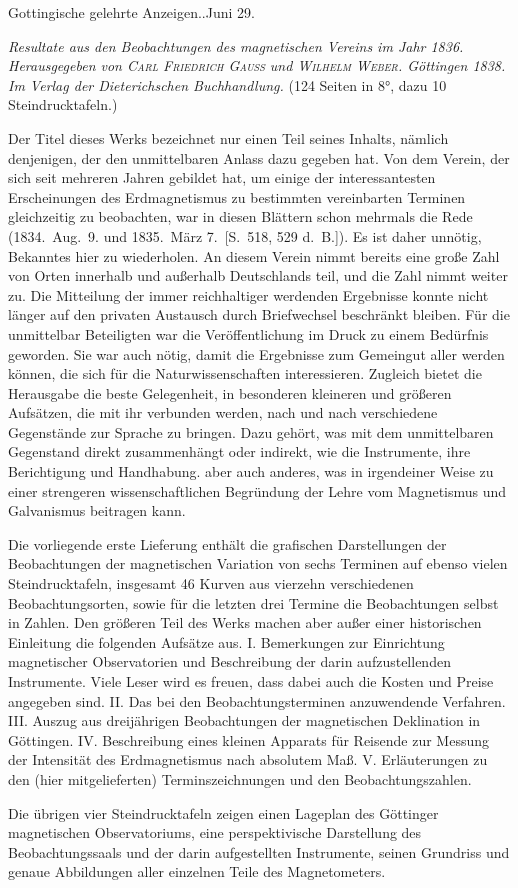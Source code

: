 \vspace{6mm}
\begin{center}\small Gottingische gelehrte Anzeigen..\quad Juni 29.\end{center}

\textit{Resultate aus den Beobachtungen des magnetischen Vereins im Jahr \textup{1836.} Herausgegeben von \textup{\textsc{Carl Friedrich Gauss}} und \textup{\textsc{Wilhelm Weber}}. Göttingen \textup{1838.} Im Verlag der Dieterichschen Buchhandlung.} (124 Seiten in 8°, dazu 10 Steindrucktafeln.)

Der Titel dieses Werks bezeichnet nur einen Teil seines Inhalts, nämlich denjenigen, der den unmittelbaren Anlass dazu gegeben hat. Von dem Verein, der sich seit mehreren Jahren gebildet hat, um einige der interessantesten Erscheinungen des Erdmagnetismus zu bestimmten vereinbarten Terminen gleichzeitig zu beobachten, war in diesen Blättern schon mehrmals die Rede (1834.\ Aug.\ 9. und 1835.\ März 7.\ [S.\ 518, 529 d.\ B.]). Es ist daher unnötig, Bekanntes hier zu wiederholen. An diesem Verein nimmt bereits eine große Zahl von Orten innerhalb und außerhalb Deutschlands teil, und die Zahl nimmt weiter zu. Die Mitteilung der immer reichhaltiger werdenden Ergebnisse konnte nicht länger auf den privaten Austausch durch Briefwechsel beschränkt bleiben. Für die unmittelbar Beteiligten war die Veröffentlichung im Druck zu einem Bedürfnis geworden. Sie war auch nötig, damit die Ergebnisse zum Gemeingut aller werden können, die sich für die Naturwissenschaften interessieren. Zugleich bietet die Herausgabe die beste Gelegenheit, in besonderen kleineren und größeren Aufsätzen, die mit ihr verbunden werden, nach und nach verschiedene Gegenstände zur Sprache zu bringen. Dazu gehört, was mit dem unmittelbaren Gegenstand direkt zusammenhängt oder indirekt, wie die Instrumente, ihre Berichtigung und Handhabung. aber auch anderes, was in irgendeiner Weise zu einer strengeren wissenschaftlichen Begründung der Lehre vom Magnetismus und Galvanismus beitragen kann.

Die vorliegende erste Lieferung enthält die grafischen Darstellungen der Beobachtungen der magnetischen Variation von sechs Terminen auf ebenso vielen Steindrucktafeln, insgesamt 46 Kurven aus vierzehn verschiedenen Beobachtungsorten, sowie für die letzten drei Termine die Beobachtungen selbst in Zahlen. Den größeren Teil des Werks machen aber außer einer historischen Einleitung
die folgenden Aufsätze aus. I. Bemerkungen zur Einrichtung magnetischer Observatorien und Beschreibung der darin aufzustellenden Instrumente. Viele Leser wird es freuen, dass dabei auch die Kosten und Preise angegeben sind. II. Das bei den Beobachtungsterminen anzuwendende Verfahren. III. Auszug aus dreijährigen Beobachtungen der magnetischen Deklination in Göttingen. IV. Beschreibung eines kleinen Apparats für Reisende zur Messung der Intensität des Erdmagnetismus nach absolutem Maß. V. Erläuterungen zu den (hier mitgelieferten) Terminszeichnungen und den Beobachtungszahlen.

Die übrigen vier Steindrucktafeln zeigen einen Lageplan des Göttinger magnetischen Observatoriums, eine perspektivische Darstellung des Beobachtungssaals und der darin aufgestellten Instrumente, seinen Grundriss und genaue Abbildungen aller einzelnen Teile des Magnetometers.

